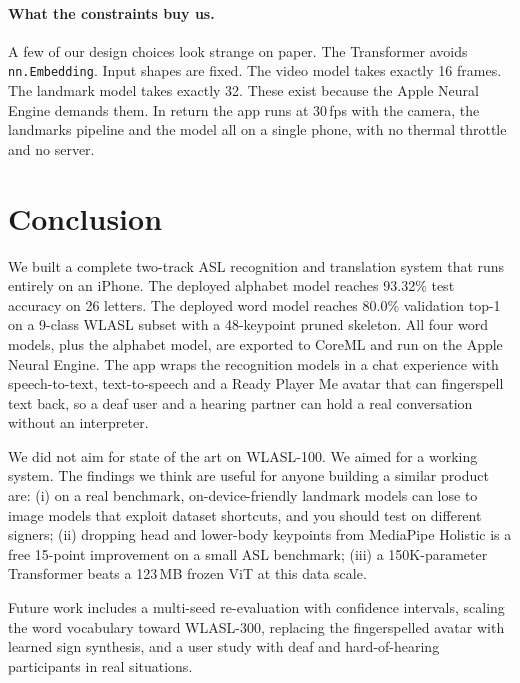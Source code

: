 \documentclass[11pt]{article}
\begin{document}
\paragraph{What the constraints buy us.} A few of our design choices look strange on paper. The Transformer avoids \texttt{nn.Embedding}. Input shapes are fixed. The video model takes exactly 16 frames. The landmark model takes exactly 32. These exist because the Apple Neural Engine demands them. In return the app runs at 30\,fps with the camera, the landmarks pipeline and the model all on a single phone, with no thermal throttle and no server.

\section{Conclusion}

We built a complete two-track ASL recognition and translation system that runs entirely on an iPhone. The deployed alphabet model reaches 93.32\% test accuracy on 26 letters. The deployed word model reaches 80.0\% validation top-1 on a 9-class WLASL subset with a 48-keypoint pruned skeleton. All four word models, plus the alphabet model, are exported to CoreML and run on the Apple Neural Engine. The app wraps the recognition models in a chat experience with speech-to-text, text-to-speech and a Ready Player Me avatar that can fingerspell text back, so a deaf user and a hearing partner can hold a real conversation without an interpreter.

We did not aim for state of the art on WLASL-100. We aimed for a working system. The findings we think are useful for anyone building a similar product are: (i) on a real benchmark, on-device-friendly landmark models can lose to image models that exploit dataset shortcuts, and you should test on different signers; (ii) dropping head and lower-body keypoints from MediaPipe Holistic is a free 15-point improvement on a small ASL benchmark; (iii) a 150K-parameter Transformer beats a 123\,MB frozen ViT at this data scale.

Future work includes a multi-seed re-evaluation with confidence intervals, scaling the word vocabulary toward WLASL-300, replacing the fingerspelled avatar with learned sign synthesis, and a user study with deaf and hard-of-hearing participants in real situations.


\end{document}
